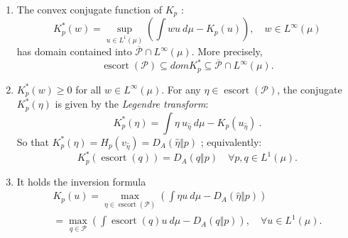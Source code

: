 \documentclass[graybox]{svmult}
\newcommand{\escortof}[1]{\operatorname{escort}\left(#1\right)}
\begin{document}
\begin{proposition}
\begin{enumerate}
\item The convex conjugate function of $K_{p}$ :
\begin{equation}\label{eq:FEN}
K_{p}^{\ast }\left( w\right) =\sup_{u\in L^{1}(\mu )}\left(\int wu\ d\mu
-K_{p}\left( u\right)\right), \quad w\in L^{\infty }(\mu )  
\end{equation}
has domain contained into $\overline{\mathcal P}\cap L^{\infty}(\mu)$. More precisely,
\begin{equation*}
\escortof{\mathcal P}\subseteq domK_{p}^{\ast }\subseteq \overline{\mathcal P}\cap L^{\infty}(\mu).
\end{equation*}

\item 
$K_{p}^{\ast }\left( w\right) \geq 0$ for all $w \in L^{\infty}(\mu)$. For any $\eta \in \escortof{\mathcal P}$,  the conjugate $K_p^*(\eta)$ is given by the \emph{Legendre transform}:
  \begin{equation*}
K_p^*(\eta) = \int \eta\ u_{\hat \eta} \ d\mu - K_p(u_{\hat \eta}) \  .    
\end{equation*}
So that \quad  $K_p^*(\eta)  = H_p(v_{\hat \eta}) = D_A(\hat \eta\Vert p)$ ; equivalently:
 \begin{equation*}
K_p^*(\escortof q)  = D_A(q\Vert p) \quad \forall p,q \in L^1 (\mu ) .   
\end{equation*}

\item It holds the inversion formula
	\begin{align*} 
K_{p}\left( u\right) =\max_{\eta \in  \escortof {\mathcal P} }\left(\int \eta u\ d\mu
- D_A(\hat \eta \Vert p) \right) \\ 
= \max_{q\in \mathcal{P}}  \left(\int \escortof q u\ d\mu
- D_A(q\Vert p) \right),\quad \forall u \in L^{1}(\mu ). 
\end{align*}
\end{enumerate}
\end{proposition}
%
\end{document}
